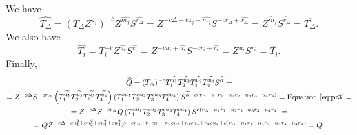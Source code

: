 \documentclass[a4paper]{article}
\begin{document}
We have 
\begin{equation}
\widehat{T_{\Delta}}= \left(T_{\Delta}Z^{z_j}\right)^{-c}Z^{\widehat{m_j}}S^{\widehat{r_{\Delta}}} = 
Z^{-c\Delta-cz_j+\widehat{m_j}}S^{-cr_{\Delta}+\widehat{r_{\Delta}}} = Z^{\widetilde{m_j}}S^{\widetilde{r_{\Delta}}} = \overline{T_{\Delta}}.
\end{equation}
We also have
\begin{equation}
\widehat{T_i}=T_i^{-c}Z^{\widehat{u_i}} S^{\widehat{r_i}} = 
Z^{-cu_i+\widehat{u_i}}S^{-cr_i+\widehat{r_i}} = Z^{\widetilde{u_i}}S^{\widetilde{r_i}} = \overline{T_i}.
\end{equation}
 Finally,
\begin{multline}
\widehat{Q}=(T_{\Delta})^{-c}T_1^{\widehat{u_1}}T_2^{\widehat{u_2}}T_3^{\widehat{u_3}}T_4^{\widehat{u_4}}
S^{\widehat{\alpha}} =\\= Z^{-c\Delta}S^{-cr_{\Delta}
}
\left(T_1^{\widetilde{u_1}}T_2^{\widetilde{u_2}}
T_3^{\widetilde{u_3}} T_4^{\widetilde{u_4}}\right)
\left(T_1^{cu_1}T_2^{cu_2}T_3^{cu_3} T_4^{cu_4}\right)
S^{\widetilde{\alpha}+c(r_{\Delta}- u_1r_1 - u_2r_2 - u_3r_3 - u_4r_4)}=\text{Equation~\eqref{eq:pr3}}=\\=
Z^{-c\Delta}S^{-cr_{\Delta}
}
Q
\left(T_1^{cu_1}T_2^{cu_2}T_3^{cu_3} T_4^{cu_4}\right)
S^{c(r_{\Delta}- u_1r_1 - u_2r_2 - u_3r_3 - u_4r_4)}=\\=
Q Z^{-c\Delta+cu_1^2+cu_2^2+ cu_3^2+cu_4^2}S^{-cr_{\Delta}+r_1cu_1+r_2cu_2+r_3cu_3+r_4cu_4+c(r_{\Delta}- u_1r_1 - u_2r_2 - u_3r_3 - u_4r_4)} = Q.
\end{multline}
 
\end{document}
